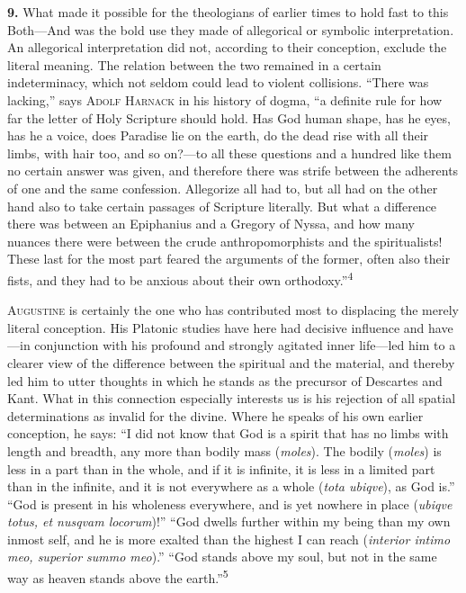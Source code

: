 \documentclass[12pt,a4paper]{book}
\newcommand{\opage}[1]{\marginnote{\footnotesize\textit{[#1]}}}
\begin{document}
\noindent\textbf{9.} What made it possible for the theologians of earlier
times to hold fast to this Both---And was the bold use they made of
allegorical or symbolic interpretation. An allegorical interpretation did
not, according to their conception, exclude the literal meaning. The relation
between the two remained in a certain indeterminacy, which not seldom could
lead to violent collisions. ``There was lacking,'' says \textsc{Adolf
Harnack} in his history of dogma, ``a definite rule for how far the letter of
Holy Scripture should hold. Has God human shape, has he eyes, has he a voice,
does Paradise lie on the earth, do the dead rise with all their limbs, with
hair too, and so on?---to all these questions and a hundred like them no
certain answer was given, and therefore there was strife between the adherents
of one and the same confession. Allegorize all had to, but all had on the
other hand also to take certain passages of Scripture literally. But what a
difference there was between an Epiphanius and a Gregory of Nyssa, and how
many nuances there were between the crude anthropomorphists and the
spiritualists! These last for the most part feared the arguments of the
former, often also their fists, and they had to be anxious about their own
orthodoxy.''\textsuperscript{4}

\textsc{Augustine} is certainly the one who has contributed most to
displacing the merely literal conception. His Platonic studies have here had
decisive influence and have---in conjunction with his profound and strongly
agitated inner life---led him to a clearer view of the difference between the
spiritual and the material, and thereby led him to utter thoughts in which he
stands as the precursor of Descartes and Kant. What in this connection
especially interests us is his rejection of all spatial determinations as
invalid for the divine. Where he speaks of his own 
\opage{27}earlier conception, he
says: ``I did not know that God is a spirit that has no limbs with length and
breadth, any more than bodily mass (\textit{moles}). The bodily
(\textit{moles}) is less in a part than in the whole, and if it is infinite,
it is less in a limited part than in the infinite, and it is not everywhere
as a whole (\textit{tota ubiqve}), as God is.'' ``God is present in his
wholeness everywhere, and is yet nowhere in place (\textit{ubiqve totus, et
nusqvam locorum})!'' ``God dwells further within my being than my own inmost
self, and he is more exalted than the highest I can reach (\textit{interior
intimo meo, superior summo meo}).'' ``God stands above my soul, but not in
the same way as heaven stands above the earth.''\textsuperscript{5}
\end{document}
